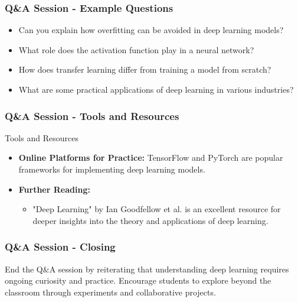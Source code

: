 \documentclass[aspectratio=169]{beamer}
\begin{document}
\begin{frame}[fragile]
    \frametitle{Q\&A Session - Example Questions}
    \begin{itemize}
        \item Can you explain how overfitting can be avoided in deep learning models?
        \item What role does the activation function play in a neural network?
        \item How does transfer learning differ from training a model from scratch?
        \item What are some practical applications of deep learning in various industries?
    \end{itemize}
\end{frame}

\begin{frame}[fragile]
    \frametitle{Q\&A Session - Tools and Resources}
    \begin{block}{Tools and Resources}
        \begin{itemize}
            \item \textbf{Online Platforms for Practice:} TensorFlow and PyTorch are popular frameworks for implementing deep learning models.
            \item \textbf{Further Reading:} 
                \begin{itemize}
                    \item "Deep Learning" by Ian Goodfellow et al. is an excellent resource for deeper insights into the theory and applications of deep learning.
                \end{itemize}
        \end{itemize}
    \end{block}
\end{frame}

\begin{frame}[fragile]
    \frametitle{Q\&A Session - Closing}
    End the Q\&A session by reiterating that understanding deep learning requires ongoing curiosity and practice. 
    Encourage students to explore beyond the classroom through experiments and collaborative projects.
\end{frame}
\end{document}
